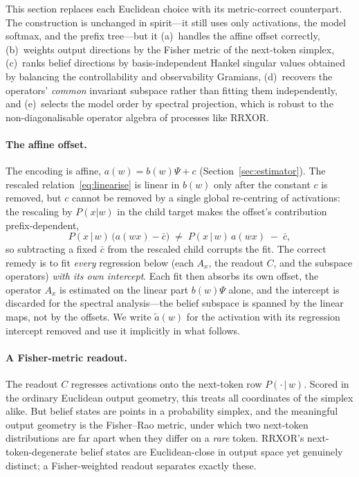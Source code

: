 \documentclass[11pt]{article}
\begin{document}
This section replaces each Euclidean choice with its metric-correct counterpart. The
construction is unchanged in spirit---it still uses only activations, the model softmax, and
the prefix tree---but it (a)~handles the affine offset correctly, (b)~weights output
directions by the Fisher metric of the next-token simplex, (c)~ranks belief directions by
basis-independent Hankel singular values obtained by balancing the controllability and
observability Gramians, (d)~recovers the operators' \emph{common} invariant subspace rather
than fitting them independently, and (e)~selects the model order by spectral projection,
which is robust to the non-diagonalisable operator algebra of processes like RRXOR.

\paragraph{The affine offset.}
The encoding is affine, $a(w)=b(w)\Psi+c$ (Section~\ref{sec:estimator}). The rescaled
relation~\eqref{eq:linearise} is linear in $b(w)$ only after the constant $c$ is removed, but
$c$ cannot be removed by a single global re-centring of activations: the rescaling by
$P(x|w)$ in the child target makes the offset's contribution prefix-dependent,
\begin{equation}
P(x\,|\,w)\,\bigl(a(wx)-\bar c\bigr)\;\neq\;P(x\,|\,w)\,a(wx)\;-\;\bar c ,
\label{eq:offset-noncommute}
\end{equation}
so subtracting a fixed $\bar c$ from the rescaled child corrupts the fit. The correct remedy
is to fit \emph{every} regression below (each $A_x$, the readout $C$, and the subspace
operators) \emph{with its own intercept}. Each fit then absorbs its own offset, the operator
$A_x$ is estimated on the linear part $b(w)\Psi$ alone, and the intercept is discarded for
the spectral analysis---the belief subspace is spanned by the linear maps, not by the
offsets. We write $\widetilde a(w)$ for the activation with its regression intercept removed
and use it implicitly in what follows.

\paragraph{A Fisher-metric readout.}
The readout $C$ regresses activations onto the next-token row $P(\cdot\,|\,w)$. Scored in the
ordinary Euclidean output geometry, this treats all coordinates of the simplex alike. But
belief states are points in a probability simplex, and the meaningful output geometry is the
Fisher--Rao metric, under which two next-token distributions are far apart when they differ
on a \emph{rare} token. RRXOR's next-token-degenerate belief states are Euclidean-close in
output space yet genuinely distinct; a Fisher-weighted readout separates exactly these.
\end{document}
